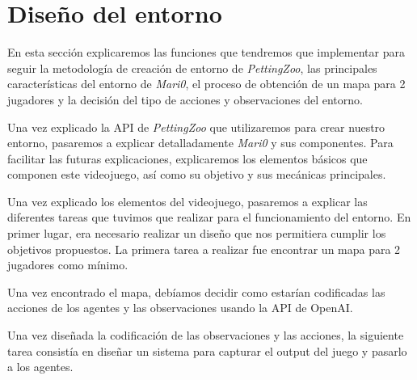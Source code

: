 \section{Diseño del entorno}

En esta sección explicaremos las funciones que tendremos que implementar para seguir la metodología de creación de entorno de \textit{PettingZoo}, las principales características del entorno de \textit{Mari0}, el proceso de obtención de un mapa para 2 jugadores y la decisión del tipo de acciones y observaciones del entorno.



Una vez explicado la API de \textit{PettingZoo} que utilizaremos para crear nuestro entorno, pasaremos a explicar detalladamente \textit{Mari0} y sus componentes. Para facilitar las futuras explicaciones, explicaremos los elementos básicos que componen este videojuego, así como su objetivo y sus mecánicas principales.



Una vez explicado los elementos del videojuego, pasaremos a explicar las diferentes tareas que tuvimos que realizar para el funcionamiento del entorno. En primer lugar, era necesario realizar un diseño que nos permitiera cumplir los objetivos propuestos. La primera tarea a realizar fue encontrar un mapa para 2 jugadores como mínimo.



Una vez encontrado el mapa, debíamos decidir como estarían codificadas las acciones de los agentes y las observaciones usando la API de OpenAI.





Una vez diseñada la codificación de las observaciones y las acciones, la siguiente tarea consistía en diseñar un sistema para capturar el output del juego y pasarlo a los agentes.



